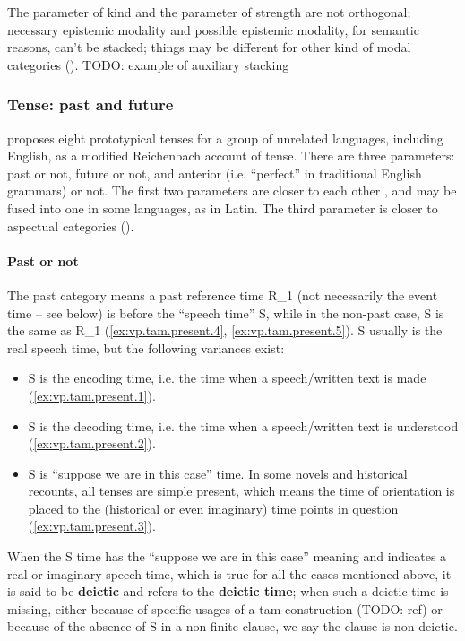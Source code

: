 \documentclass[UTF8, a4paper, oneside, scheme=plain, 12pt]{ctexbook}
\newcommand*{\citepage}[1]{p.~{#1}}
\newcommand*{\concept}[1]{\textbf{#1}}
\begin{document}
The parameter of kind and the parameter of strength
are not orthogonal;
necessary epistemic modality and possible epistemic modality, 
for semantic reasons, can't be stacked;
things may be different for other kind of modal categories (). TODO: example of auxiliary stacking



\subsubsection{Tense: past and future}

\citet[see also {\citet[\citepage{82}]{cinque1999adverbs}}]{vikner1985reichenbach} proposes 
eight prototypical tenses for a group of unrelated languages,
including English,
as a modified Reichenbach account of tense.
There are three parameters:
past or not, future or not,
and anterior (i.e. ``perfect'' in traditional English grammars) or not.
The first two parameters are closer to each other 
\citet{shlonsky2010cartographic},
and may be fused into one in some languages,
as in Latin.
The third parameter is closer to aspectual categories ().

\paragraph{Past or not} The past category means 
a past reference time R_1 (not necessarily the event time -- see below) 
is before the ``speech time'' S,
while in the non-past case, 
S is the same as R_1
(\ref{ex:vp.tam.present.4}, \ref{ex:vp.tam.present.5}).
S usually is the real speech time, 
but the following variances exist: 
\begin{itemize}
    \item S is the encoding time, i.e. the time when a speech/written text is made
    (\ref{ex:vp.tam.present.1}).
    \item S is the decoding time, i.e. the time when a speech/written text is understood
    (\ref{ex:vp.tam.present.2}).
    \item S is ``suppose we are in this case'' time.
    In some novels and historical recounts, 
    all tenses are simple present,
    which means the time of orientation is placed to 
    the (historical or even imaginary) time points in question
    (\ref{ex:vp.tam.present.3}).
\end{itemize}
When the S time has the ``suppose we are in this case'' meaning
and indicates a real or imaginary speech time, 
which is true for all the cases mentioned above, 
it is said to be \concept{deictic}
and refers to the \concept{deictic time};
when such a deictic time is missing,
either because of specific usages of a \acs{tam} construction (TODO: ref)
or because of the absence of S in a non-finite clause,
we say the clause is non-deictic.
\end{document}
